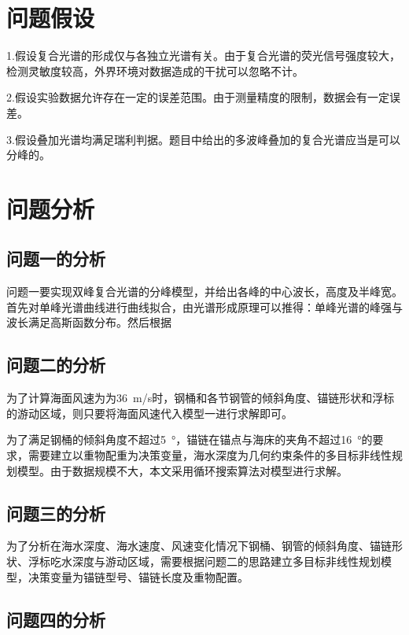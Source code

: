 \documentclass{article}
\numberwithin{equation}{subsection}
\begin{document}
\section{问题假设}
1.假设复合光谱的形成仅与各独立光谱有关。由于复合光谱的荧光信号强度较大，检测灵敏度较高，外界环境对数据造成的干扰可以忽略不计。

2.假设实验数据允许存在一定的误差范围。由于测量精度的限制，数据会有一定误差。

3.假设叠加光谱均满足瑞利判据。题目中给出的多波峰叠加的复合光谱应当是可以分峰的。



\section{问题分析}
\subsection{问题一的分析}
问题一要实现双峰复合光谱的分峰模型，并给出各峰的中心波长，高度及半峰宽。首先对单峰光谱曲线进行曲线拟合，由光谱形成原理可以推得：单峰光谱的峰强与波长满足高斯函数分布。然后根据
\subsection{问题二的分析}

为了计算海面风速为为\SI{36}{m/s}时，钢桶和各节钢管的倾斜角度、锚链形状和浮标的游动区域，则只要将海面风速代入模型一进行求解即可。

为了满足钢桶的倾斜角度不超过\SI{5}{°}，锚链在锚点与海床的夹角不超过\SI{16}{°}的要求，需要建立以重物配重为决策变量，海水深度为几何约束条件的多目标非线性规划模型。由于数据规模不大，本文采用循环搜索算法对模型进行求解。

\subsection{问题三的分析}
为了分析在海水深度、海水速度、风速变化情况下钢桶、钢管的倾斜角度、锚链形状、浮标吃水深度与游动区域，需要根据问题二的思路建立多目标非线性规划模型，决策变量为锚链型号、锚链长度及重物配置。

\subsection{问题四的分析}
\end{document}
